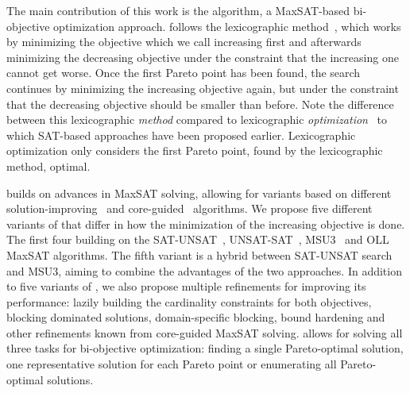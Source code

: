 The main contribution of this work is the \algname{} algorithm, a MaxSAT-based bi-objective optimization approach.
\algname{} follows the lexicographic method~\autocite{survey}, which works by minimizing the objective which we call increasing first and afterwards minimizing the decreasing objective under the constraint that the increasing one cannot get worse.
Once the first Pareto point has been found, the search continues by minimizing the increasing objective again, but under the constraint that the decreasing objective should be smaller than before.
Note the difference between this lexicographic \emph{method} compared to lexicographic \emph{optimization}~\autocite{DBLP:conf/ijcai/ArgelichLS09,DBLP:journals/amai/Marques-SilvaAGL11} to which SAT-based approaches have been proposed earlier.
Lexicographic optimization only considers the first Pareto point, found by the lexicographic method, optimal.


\algname{} builds on advances in MaxSAT solving, allowing for variants based on different solution-improving~\autocites{handbook2-maxsat,DBLP:journals/jsat/BerreP10,DBLP:journals/jsat/EenS06} and core-guided~\autocites{DBLP:journals/corr/abs-0712-1097,DBLP:conf/sat/AnsoteguiBL09,DBLP:conf/cp/MorgadoDM14,DBLP:journals/jsat/IgnatievMM19} algorithms.
We propose five different variants of \algname{} that differ in how the minimization of the increasing objective is done.
The first four building on the SAT-UNSAT~\autocite{DBLP:journals/jsat/BerreP10}, UNSAT-SAT~\autocite{DBLP:conf/sat/FuM06}, MSU3~\autocite{DBLP:journals/corr/abs-0712-1097} and OLL~\autocite{DBLP:conf/cp/MorgadoDM14} MaxSAT algorithms.
The fifth variant is a hybrid between SAT-UNSAT search and MSU3, aiming to combine the advantages of the two approaches.
In addition to five variants of \algname{}, we also propose multiple refinements for improving its performance:
lazily building the cardinality constraints for both objectives, blocking dominated solutions, domain-specific blocking, bound hardening and other refinements known from core-guided MaxSAT solving.
\algname{} allows for solving all three tasks for bi-objective optimization:
finding a single Pareto-optimal solution, one representative solution for each Pareto point or enumerating all Pareto-optimal solutions.


